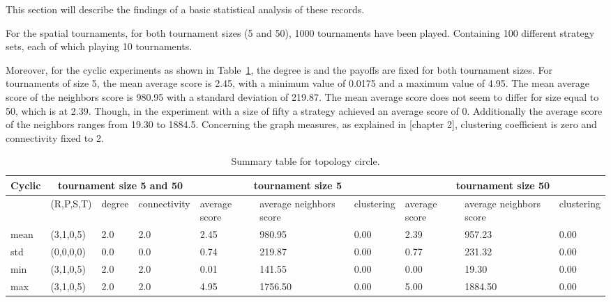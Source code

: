 This section will describe the findings of a basic statistical analysis of these
records.

For the spatial tournaments, for both tournament sizes (5 and 50),
1000 tournaments have been played. Containing 100 different strategy sets, each of
which playing 10 tournaments.

Moreover, for the cyclic experiments as shown in Table~\ref{sum-cicle}, the degree is
and the payoffs are fixed for both tournament sizes. For tournaments of size 5,
the mean average score is 2.45, with a minimum value of 0.0175 and a maximum
value of 4.95. The mean average score of the neighbors score is 980.95 with a
standard deviation of 219.87.
The mean average score does not seem to differ for size equal to 50, which is at
2.39. Though, in the experiment with a size of fifty a strategy
achieved an average score of 0. Additionally the average score of the neighbors ranges
from 19.30 to 1884.5. Concerning the graph measures, as explained in [chapter 2],
clustering coefficient is zero and connectivity fixed to 2.

\begin{table}[!hbtp]
\centering
\begin{adjustbox}{width=1\textwidth}
\small
\begin{tabular}{@{}|l|l|l|l|l|l|l|l|l|l|@{}}
\toprule
Cyclic & \multicolumn{3}{c|}{tournament size 5 and 50} & \multicolumn{3}{c|}{tournament size 5} & \multicolumn{3}{c|}{tournament size 50}                             \\\midrule

       & (R,P,S,T) & degree & connectivity & average score & average neighbors score & clustering & average score & average neighbors score & clustering \\\midrule
mean   & (3,1,0,5) & 2.0    & 2.0          & 2.45      & 980.95            & 0.00       & 2.39     & 957.23             & 0.00       \\\midrule
std    & (0,0,0,0) & 0.0    & 0.0          & 0.74      & 219.87             & 0.00       & 0.77    & 231.32              & 0.00       \\\midrule
min    & (3,1,0,5) & 2.0    & 2.0          & 0.01      & 141.55             & 0.00       & 0.00    & 19.30              & 0.00       \\\midrule
max    & (3,1,0,5) & 2.0    & 2.0          & 4.95     & 1756.50             & 0.00       & 5.00    & 1884.50             & 0.00       \\ \bottomrule
\end{tabular}
\end{adjustbox}
\caption{Summary table for topology circle.}
\label{sum-cicle}
\end{table}

